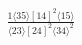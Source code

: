 \documentclass[varwidth, border=5pt]{standalone}
\begin{document}
\begin{my}
$\begin{gathered}
\scriptscriptstyle\frac{1⟨35⟩[14]^2⟨15⟩}{⟨23⟩[24]^2⟨34⟩^2}
\end{gathered}$
\end{my}
\end{document}
